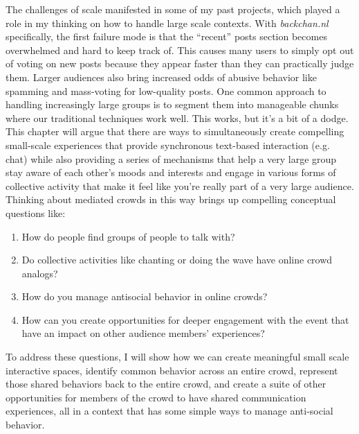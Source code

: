 The challenges of scale manifested in some of my past projects, which played a role in my thinking on how to handle large scale contexts. With \emph{backchan.nl} specifically, the first failure mode is that the ``recent'' posts section becomes overwhelmed and hard to keep track of. This causes many users to simply opt out of voting on new posts because they appear faster than they can practically judge them. Larger audiences also bring increased odds of abusive behavior like spamming and mass-voting for low-quality posts. One common approach to handling increasingly large groups is to segment them into manageable chunks where our traditional techniques work well.  This works, but it's a bit of a dodge. This chapter will argue that there are ways to simultaneously create compelling small-scale experiences that provide synchronous text-based interaction (e.g. chat) while also providing a series of mechanisms that help a very large group stay aware of each other's moods and interests and engage in various forms of collective activity that make it feel like you're really part of a very large audience. Thinking about mediated crowds in this way brings up compelling conceptual questions like: 

\begin{enumerate}
\item{How do people find groups of people to talk with?}
\item{Do collective activities like chanting or doing the wave have online crowd analogs?}
\item{How do you manage antisocial behavior in online crowds?}
\item{How can you create opportunities for deeper engagement with the event that have an impact on other audience members' experiences?}
\end{enumerate}

To address these questions, I will show how we can create meaningful small scale interactive spaces, identify common behavior across an entire crowd, represent those shared behaviors back to the entire crowd, and create a suite of other opportunities for members of the crowd to have shared communication experiences, all in a context that has some simple ways to manage anti-social behavior.

